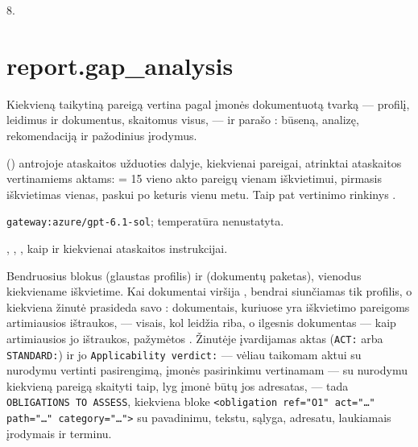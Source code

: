  8.


\section{report.gap\_analysis}\label{sec:aprompts:report-gap_analysis}

 Kiekvieną taikytiną pareigą vertina pagal įmonės dokumentuotą
tvarką --- profilį, leidimus ir dokumentus, skaitomus visus, --- ir parašo :
būseną, analizę, rekomendaciją ir pažodinius įrodymus.

  () antrojoje
ataskaitos užduoties dalyje, kiekvienai pareigai, atrinktai ataskaitos vertinamiems aktams:
 = 15 vieno akto pareigų vienam iškvietimui, pirmasis iškvietimas
vienas, paskui po keturis vienu metu. Taip pat vertinimo rinkinys .

 \texttt{gateway:azure/gpt-6.1-sol}; temperatūra
nenustatyta.

 , , , kaip ir
kiekvienai ataskaitos instrukcijai.

 Bendruosius blokus  (glaustas profilis) ir
 (dokumentų paketas), vienodus kiekviename iškvietime. Kai dokumentai viršija
, bendrai siunčiamas tik profilis, o kiekviena žinutė prasideda savo
: dokumentais, kuriuose yra iškvietimo pareigoms artimiausios ištraukos, ---
visais, kol leidžia riba, o ilgesnis dokumentas --- kaip artimiausios jo ištraukos, pažymėtos
. Žinutėje įvardijamas aktas (\texttt{ACT:} arba \texttt{STANDARD:}) ir jo
\texttt{Applicability verdict:} --- vėliau taikomam aktui su nurodymu vertinti pasirengimą,
įmonės pasirinkimu vertinamam --- su nurodymu kiekvieną pareigą skaityti taip, lyg įmonė būtų
jos adresatas, --- tada \texttt{OBLIGATIONS TO ASSESS}, kiekviena bloke
\texttt{<obligation ref="O1" act="…" path="…" category="…">} su pavadinimu, tekstu, sąlyga,
adresatu, laukiamais įrodymais ir terminu.

